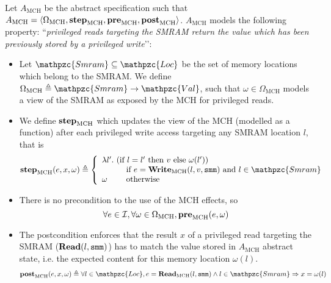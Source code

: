 \begin{example} \label{ex:mch-abs-specs} Let
  $A_{\mathrm{MCH}}$ be the abstract specification such that $A_{\mathrm{MCH}} = \langle
    \Omega_{\mathrm{MCH}}, \mathbf{\mathbf{step}}_{\mathrm{MCH}}, \mathbf{\mathbf{pre}}_{\mathrm{MCH}}, \mathbf{\mathbf{post}}_{\mathrm{MCH}}
    \rangle$.
  $A_{\mathrm{MCH}}$ models the following property: ``\emph{privileged reads
  targeting the SMRAM return the value which has been previously stored
  by a privileged write}’’:
  \begin{itemize}
  \item Let $\mathpzc{Smram} \subseteq
    \mathpzc{Loc}$ be the set of memory locations which belong to the SMRAM.  We
    define $\Omega_{\mathrm{MCH}} \triangleq \mathpzc{Smram} \rightarrow
    \mathpzc{Val}$, such that $\omega \in \Omega_{\mathrm{MCH}}$ models a
    view of the SMRAM as exposed by the MCH for privileged reads.
  \item We define $\mathbf{\mathbf{step}}_{\mathrm{MCH}}$ which updates the view of the MCH
  (modelled as a function) after each privileged
  write access targeting any SMRAM location $l$, that is
    \[ \func{step}_{\mathrm{MCH}}(e, x, \omega) \triangleq \left\{
        \begin{array}{l}
          \lambda l'.  \text{ (if } l = l' \text{ then } v \text{ else } \omega(l')) \\
            \qquad\ \ \text{ if } e = \func{Write}_{\mathrm{MCH}}(l, v, \val{smm})
            \text{ and } l \in \mathpzc{Smram} \\
          \omega \qquad \text{ otherwise}
        \end{array}
      \right.
    \]
  \item There is no precondition to the use of the MCH effects, so \[ \forall e
  \in \mathcal{I},\forall \omega \in \Omega_{\mathrm{MCH}}, \mathbf{\mathbf{pre}}_{\mathrm{MCH}}(e,
  \omega) \]
  \item The postcondition enforces that the result $x$ of a privileged read
  targeting the SMRAM ($\mathbf{\mathbf{Read}}(l, \mathtt{smm})$) has to match the value
  stored in $A_{\mathrm{MCH}}$ abstract state, i.e. the expected content for
  this memory location $\omega(l)$.
    \[ \func{post}_{\mathrm{MCH}}(e, x, \omega) \triangleq \forall l \in \mathpzc{Loc}, e
      = \func{Read}_{\mathrm{MCH}}(l, \val{smm}) \wedge l \in \mathpzc{Smram}
      \Rightarrow x = \omega(l)
    \]
  \end{itemize}
\end{example}


